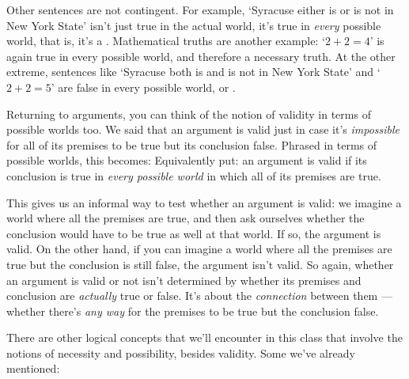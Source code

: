 Other sentences are not contingent.  For example, `Syracuse either is or is not in New York State' isn't just true in the actual world, it's true in \emph{every} possible world, that is, it's a .  Mathematical truths are another example: `$2+2 = 4$' is again true in every possible world, and therefore a necessary truth. At the other extreme, sentences like `Syracuse both is and is not in New York State'  and `$2+2 = 5$' are false in every possible world, or .  

Returning to arguments, you can think of the notion of validity in terms of possible worlds too.  We said that an argument is valid just in case it's \emph{impossible} for all of its premises to be true but its conclusion false.  Phrased in terms of possible worlds, this becomes:
Equivalently put: an argument is valid if its conclusion is true in \emph{every possible world} in which all of its premises are true. 

This gives us an informal way to test whether an argument is valid: we imagine a world where all the premises are true, and then ask ourselves whether the conclusion would have to be true as well at that world.  If so, the argument is valid.  On the other hand, if you can imagine a world where all the premises are true but the conclusion is still false, the argument isn't valid.  So again, whether an argument is valid or not isn't determined by whether its premises and conclusion are \emph{actually} true or false.  It's about the \emph{connection} between them --- whether there's \emph{any way} for the premises to be true but the conclusion false.

There are other logical concepts that we'll encounter in this class that involve the notions of necessity and possibility, besides validity.  Some we've already mentioned:


